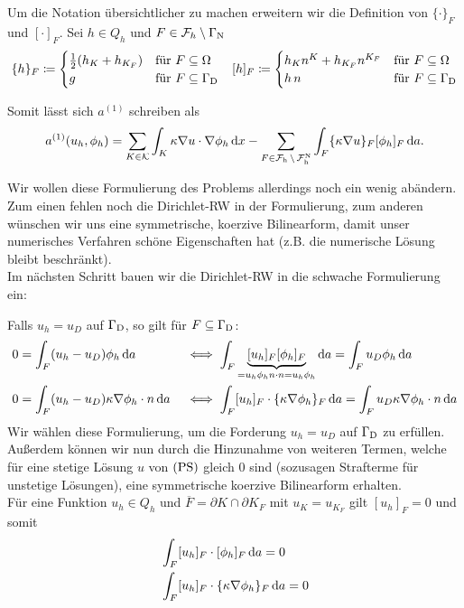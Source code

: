 \begin{notation}
	Um die Notation übersichtlicher zu machen erweitern wir die Definition von $ \{\cdot\}_F $ und $ [\cdot]_F $. Sei $ h \in Q_h $ und $ F \in \mathcal{F}_h \setminus \Gamma_{\text{N}} $
	\begin{align*}
		&\{ h \}_F \coloneqq
		 \begin{cases}
					\frac{1}{2} (h_K + h_{K_F} ) &\text{für } F \subseteq \Omega\\
					g &\text{für } F \subseteq \Gamma_{\text{D}}
		\end{cases}
	  &[h]_F \coloneqq \begin{cases}
			h_K n^K + h_{K_F} n^{K_F} &\text{für } F \subseteq \Omega\\
			h \, n &\text{für } F \subseteq \Gamma_{\text{D}}
		\end{cases}
	\end{align*}
	
	Somit lässt sich $ a^{(1)} $ schreiben als
	\[a^{(1)}(u_h, \phi_h) = \sum_{K \in \mathcal{K}} \int_K \kappa \nabla u \cdot \nabla \phi_h \mathop{}\!\mathrm{d} x - \sum_{F \in \operatorname{\mathcal{F}_h} \setminus \operatorname{\mathcal{F}_h^{\text{N}}}} \int_{F} \{\kappa \nabla u \}_F [\phi_h]_F \mathop{}\!\mathrm{d} a. \]
\end{notation}





Wir wollen diese Formulierung des Problems allerdings noch ein wenig abändern. Zum einen fehlen noch die Dirichlet-RW in der Formulierung, zum anderen wünschen wir uns eine symmetrische, koerzive Bilinearform, damit unser numerisches Verfahren schöne Eigenschaften hat (z.B. die numerische Lösung bleibt beschränkt).\\
Im nächsten Schritt bauen wir die Dirichlet-RW in die schwache Formulierung ein:

Falls $ u_h = u_D $ auf $ \Gamma_{\text{D}} $, so gilt für $ F \subseteq \Gamma_{\text{D}}  $:
\begin{align}
	\label{D-RW1}& 0=\int_F (u_h - u_D) \phi_h \mathop{}\!\mathrm{d} a &&\iff \int_F \underbrace{[u_h]_F [\phi_h]_F}_{= u_h \phi_h n \cdot n = u_h \phi_h} \mathop{}\!\mathrm{d} a = \int_F u_D \phi_h \mathop{}\!\mathrm{d} a  \\
	\label{D-RW2}& 0  = \int_F (u_h - u_D) \kappa \nabla \phi_h \cdot n \mathop{}\!\mathrm{d} a  &&\iff \int_F [u_h]_F \cdot \{\kappa \nabla\phi_h\}_F \mathop{}\!\mathrm{d} a = \int_F u_D \kappa \nabla \phi_h \cdot n \mathop{}\!\mathrm{d} a 
\end{align} 
Wir wählen diese Formulierung, um die Forderung $ u_h = u_D $ auf $ \Gamma_{\text{D}} $ zu erfüllen. 
Außerdem können wir nun durch die Hinzunahme von weiteren Termen, welche für eine stetige Lösung $ u $ von $ \operatorname{(PS)} $ gleich 0 sind (sozusagen Strafterme für unstetige Lösungen), eine symmetrische koerzive Bilinearform erhalten.\\
Für eine Funktion $ u_h \in Q_h $ und $ \overline{F} = \partial K \cap \partial K_F $ mit $ u_K = u_{K_F} $ gilt $ [u_h]_F = 0 $ und somit
\begin{align}
	\label{innen1} &\int_F [u_h]_F \cdot [\phi_h]_F \mathop{}\!\mathrm{d} a = 0\\
	\label{innen2}&\int_F [u_h]_F \cdot \{ \kappa\nabla\phi_h \}_F \mathop{}\!\mathrm{d} a = 0
\end{align}

